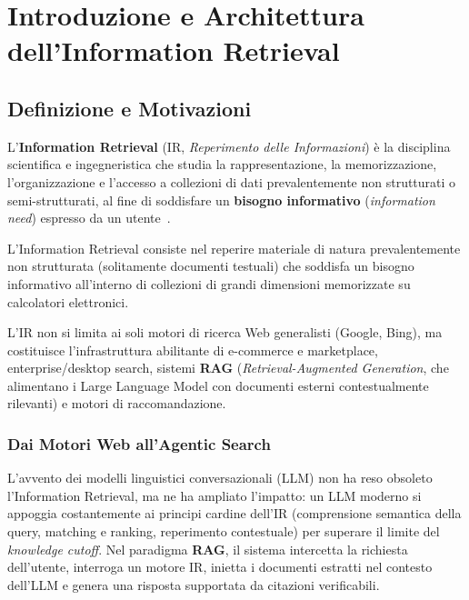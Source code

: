 \chapter{Introduzione e Architettura dell'Information Retrieval}

\FloatBarrier
\section{Definizione e Motivazioni}

L'\textbf{Information Retrieval} (IR, \textit{Reperimento delle Informazioni}) \`e la disciplina scientifica e ingegneristica che studia la rappresentazione, la memorizzazione, l'organizzazione e l'accesso a collezioni di dati prevalentemente non strutturati o semi-strutturati, al fine di soddisfare un \textbf{bisogno informativo} (\textit{information need}) espresso da un utente~\cite{manning2008,buttcher2010}.

\begin{definition}
L'Information Retrieval consiste nel reperire materiale di natura prevalentemente non strutturata (solitamente documenti testuali) che soddisfa un bisogno informativo all'interno di collezioni di grandi dimensioni memorizzate su calcolatori elettronici.
\end{definition}

L'IR non si limita ai soli motori di ricerca Web generalisti (Google, Bing), ma costituisce l'infrastruttura abilitante di e-commerce e marketplace, enterprise/desktop search, sistemi \textbf{RAG} (\textit{Retrieval-Augmented Generation}, che alimentano i Large Language Model con documenti esterni contestualmente rilevanti) e motori di raccomandazione.

\subsection{Dai Motori Web all'Agentic Search}

L'avvento dei modelli linguistici conversazionali (LLM) non ha reso obsoleto l'Information Retrieval, ma ne ha ampliato l'impatto: un LLM moderno si appoggia costantemente ai principi cardine dell'IR (comprensione semantica della query, matching e ranking, reperimento contestuale) per superare il limite del \textit{knowledge cutoff}. Nel paradigma \textbf{RAG}, il sistema intercetta la richiesta dell'utente, interroga un motore IR, inietta i documenti estratti nel contesto dell'LLM e genera una risposta supportata da citazioni verificabili.

